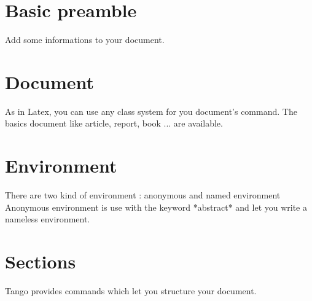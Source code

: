 \section{Basic preamble}
Add some informations to your document.

\section{Document}
As in Latex, you can use any class system for you document's command.
The basics document like article, report, book ... are available.

\section{Environment}
There are two kind of environment : anonymous and named environment
Anonymous environment is use with the keyword *abstract* and let you write a nameless environment.

\code{{{
  \begin{EnvironementA}
  \end{EnvironmentA}

  \begin{abstract}
  \end{abstract}
}}}

\section{Sections}
Tango provides commands which let you structure your document.

